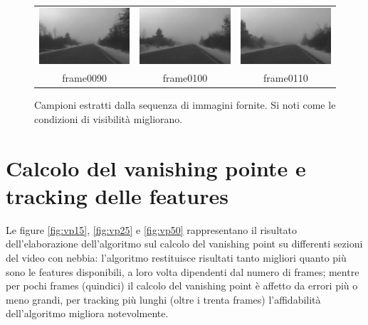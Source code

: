 \documentclass[12pt]{report}
\begin{document}
\begin{figure}[H]
\begin{tabular}{ccc}
	\includegraphics[scale=\videoScale]{images/frame0090.jpg} & \includegraphics[scale=\videoScale]{images/frame0100.jpg} & \includegraphics[scale=\videoScale]{images/frame0110.jpg}\\
	frame0090 & frame0100 & frame0110 \\
\end{tabular}
\caption{Campioni estratti dalla sequenza di immagini fornite. Si noti come le condizioni di visibilit\`a migliorano.}
\label{fig:video}
\end{figure}

\section{Calcolo del vanishing pointe e tracking delle features}

\noindent Le figure \ref{fig:vp15}, \ref{fig:vp25} e \ref{fig:vp50} rappresentano il risultato dell'elaborazione dell'algoritmo sul calcolo del vanishing point su differenti sezioni del video con nebbia: l'algoritmo restituisce risultati tanto migliori quanto pi\`u sono le features disponibili, a loro volta dipendenti dal numero di frames; mentre per pochi frames (quindici) il calcolo del vanishing point \`e affetto da errori pi\`u o meno grandi, per tracking pi\`u lunghi (oltre i trenta frames) l'affidabilit\`a dell'algoritmo migliora notevolmente.\\
\end{document}
